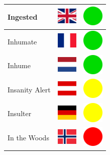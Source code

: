 \documentclass[12pt, a4paper, twoside]{report}
\begin{document}
\begin{center}
\begin{longtable}{|p{5cm}|p{2cm}|p{2cm}|}
 Ingested                                                   & \includegraphics[width=1cm]{../4x3/gb} &   \includegraphics[width=1cm]{../likes/y} \\ \hline
 Inhumate                                                   & \includegraphics[width=1cm]{../4x3/fr} &   \includegraphics[width=1cm]{../likes/y} \\ \hline
 Inhume                                                     & \includegraphics[width=1cm]{../4x3/nl} &   \includegraphics[width=1cm]{../likes/y} \\ \hline
 Insanity Alert                                             & \includegraphics[width=1cm]{../4x3/at} &   \includegraphics[width=1cm]{../likes/m} \\ \hline
 Insulter                                                   & \includegraphics[width=1cm]{../4x3/de} &   \includegraphics[width=1cm]{../likes/m} \\ \hline
 In the Woods                                               & \includegraphics[width=1cm]{../4x3/no} &   \includegraphics[width=1cm]{../likes/n} \\ \hline

\end{longtable}
\end{center}
\end{document}
